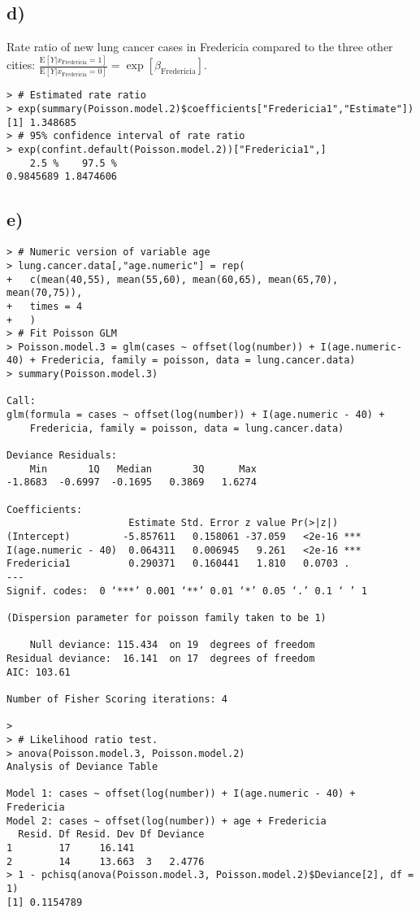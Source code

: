 \documentclass[a4paper]{article}
\newcommand{\E}{\mathrm{E}}
\begin{document}
\vspace{\baselineskip}
\subsection{d)}
Rate ratio of new lung cancer cases in Fredericia compared to the three other cities:
$\frac{\E\left[Y|x_{\mathrm{Fredericia}} = 1\right]}{\E\left[Y|x_{\mathrm{Fredericia}} = 0\right]} = \exp\left[\beta_{\mathrm{Fredericia}}\right]$.

\begin{lstlisting}
> # Estimated rate ratio
> exp(summary(Poisson.model.2)$coefficients["Fredericia1","Estimate"])
[1] 1.348685
> # 95% confidence interval of rate ratio
> exp(confint.default(Poisson.model.2))["Fredericia1",]
    2.5 %    97.5 % 
0.9845689 1.8474606 
\end{lstlisting}


\vspace{\baselineskip}
\subsection{e)}
\begin{lstlisting}
> # Numeric version of variable age
> lung.cancer.data[,"age.numeric"] = rep(
+   c(mean(40,55), mean(55,60), mean(60,65), mean(65,70), mean(70,75)),
+   times = 4
+   )
> # Fit Poisson GLM
> Poisson.model.3 = glm(cases ~ offset(log(number)) + I(age.numeric-40) + Fredericia, family = poisson, data = lung.cancer.data)
> summary(Poisson.model.3)

Call:
glm(formula = cases ~ offset(log(number)) + I(age.numeric - 40) + 
    Fredericia, family = poisson, data = lung.cancer.data)

Deviance Residuals: 
    Min       1Q   Median       3Q      Max  
-1.8683  -0.6997  -0.1695   0.3869   1.6274  

Coefficients:
                     Estimate Std. Error z value Pr(>|z|)    
(Intercept)         -5.857611   0.158061 -37.059   <2e-16 ***
I(age.numeric - 40)  0.064311   0.006945   9.261   <2e-16 ***
Fredericia1          0.290371   0.160441   1.810   0.0703 .  
---
Signif. codes:  0 ‘***’ 0.001 ‘**’ 0.01 ‘*’ 0.05 ‘.’ 0.1 ‘ ’ 1

(Dispersion parameter for poisson family taken to be 1)

    Null deviance: 115.434  on 19  degrees of freedom
Residual deviance:  16.141  on 17  degrees of freedom
AIC: 103.61

Number of Fisher Scoring iterations: 4

> 
> # Likelihood ratio test.
> anova(Poisson.model.3, Poisson.model.2)
Analysis of Deviance Table

Model 1: cases ~ offset(log(number)) + I(age.numeric - 40) + Fredericia
Model 2: cases ~ offset(log(number)) + age + Fredericia
  Resid. Df Resid. Dev Df Deviance
1        17     16.141            
2        14     13.663  3   2.4776
> 1 - pchisq(anova(Poisson.model.3, Poisson.model.2)$Deviance[2], df = 1)
[1] 0.1154789
\end{lstlisting}
\end{document}
